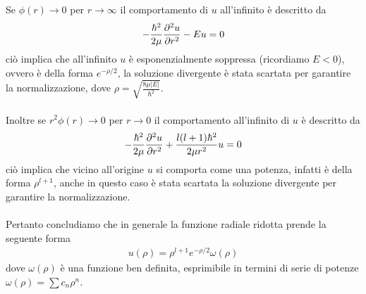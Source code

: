 \documentclass{article}
\begin{document}
Se $\phi(r) \rightarrow 0$ per $r \rightarrow \infty$ il comportamento di $u$ all'infinito è descritto da
\begin{gather}
    -\frac{\hbar^2}{2\mu}\frac{\partial^2 u}{\partial r^2} - Eu = 0 \notag
\end{gather}
ciò implica che all'infinito $u$ è esponenzialmente soppressa (ricordiamo $E < 0$), ovvero è della forma $e^{-\rho/2}$, la soluzione divergente è stata scartata per garantire la normalizzazione, dove $\rho = \sqrt{\frac{8\mu|E|}{\hbar^2}}$. \\ \\
Inoltre se $r^2\phi(r) \rightarrow 0$ per $r \rightarrow 0$ il comportamento all'infinito di $u$ è descritto da
\begin{gather}
    -\frac{\hbar^2}{2\mu}\frac{\partial^2 u}{\partial r^2} + \frac{l(l+1)\hbar^2}{2\mu r^2}u = 0 \notag
\end{gather}
ciò implica che vicino all'origine $u$ si comporta come una potenza, infatti è della forma $\rho^{l+1}$, anche in questo caso è stata scartata la soluzione divergente per garantire la normalizzazione. \\ \\
Pertanto concludiamo che in generale la funzione radiale ridotta prende la seguente forma
\begin{gather}
    u(\rho) = \rho^{l+1}e^{-\rho/2}\omega(\rho) \tag{6.1.1}
\end{gather}
dove $\omega(\rho)$ è una funzione ben definita, esprimibile in termini di serie di potenze $\omega(\rho) = \sum c_n\rho^n$. 
\end{document}
